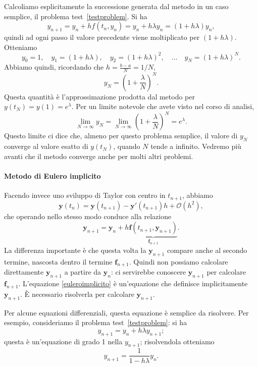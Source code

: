 \documentclass[a4paper]{report}
\theoremstyle{definiton}
\theoremstyle{remark}
\newcommand{\y}{\mathbf{y}}
\newcommand{\f}{\mathbf{f}}
\begin{document}
Calcoliamo esplicitamente la successione generata dal metodo in un caso semplice, il problema test~\eqref{testproblem}. Si ha
\[
    y_{n+1} = y_n + hf(t_n,y_n) = y_n + h\lambda y_n = (1+h\lambda)y_n,
\]
quindi ad ogni passo il valore precedente viene moltiplicato per $(1+h\lambda)$. Otteniamo
\[
y_0 = 1, \quad y_1 = (1+h\lambda), \quad y_2 = (1+h\lambda)^2, \quad \dots \quad y_N = (1+h\lambda)^N.
\]
Abbiamo quindi, ricordando che $h = \frac{b-a}{N} = 1/N$,
\[
    y_N = \left(1+\frac{\lambda}{N}\right)^N.
\]
Questa quantità è l'approssimazione prodotta dal metodo per $y(t_N) = y(1) = e^{\lambda}$. Per un limite notevole che avete visto nel corso di analisi,
\[
    \lim_{N\to \infty} y_N = \lim_{N\to \infty} \left(1+\frac{\lambda}{N}\right)^N = e^{\lambda}.
\]
Questo limite ci dice che, almeno per questo problema semplice, il valore di $y_N$ converge al valore esatto di $y(t_N)$, quando $N$ tende a infinito. Vedremo più avanti che il metodo converge anche per molti altri problemi.

\paragraph{Metodo di Eulero implicito}

Facendo invece uno sviluppo di Taylor con centro in $t_{n+1}$, abbiamo
\begin{equation} \label{euleroimp_taylor}
    \y(t_n) = \y(t_{n+1}) - \y'(t_{n+1})h + \mathcal{O}(h^2),    
\end{equation}
che operando nello stesso modo conduce alla relazione
\begin{equation} \label{euleroimplicito}
    \y_{n+1} = \y_n + h \underbrace{\f(t_{n+1}, \y_{n+1})}_{\f_{n+1}}.    
\end{equation}
La differenza importante è che questa volta la $\y_{n+1}$ compare anche al secondo termine, nascosta dentro il termine $\f_{n+1}$. Quindi non possiamo calcolare direttamente $\y_{n+1}$ a partire da $\y_n$: ci servirebbe conoscere $\y_{n+1}$ per calcolare $\f_{n+1}$. L'equazione \eqref{euleroimplicito} è un'equazione che definisce implicitamente $\y_{n+1}$. È necessario risolverla per calcolare $\y_{n+1}$. 

Per alcune equazioni differenziali, questa equazione è semplice da risolvere. Per esempio, consideriamo il problema test~\eqref{testproblem}: si ha
\[
    y_{n+1} = y_n + h\lambda y_{n+1};
\]
questa è un'equazione di grado 1 nella $y_{n+1}$; risolvendola otteniamo
\[
y_{n+1} = \frac{1}{1-h\lambda} y_n.
\]
\end{document}
